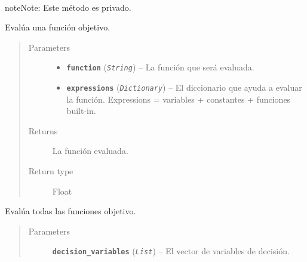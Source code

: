 \documentclass[letterpaper,10pt,english]{sphinxmanual}
\begin{document}
\begin{fulllineitems}
\begin{fulllineitems}
\label{Model/Community/Population/Individual/Individual:Model.Community.Population.Individual.Individual.Individual._Individual__evaluate_single_function}~
\begin{notice}{note}{Note:}
Este método es privado.
\end{notice}

Evalúa una función objetivo.
\begin{quote}\begin{description}
\item[{Parameters}] \leavevmode\begin{itemize}
\item {} 
\textbf{\texttt{function}} (\emph{\texttt{String}}) -- La función que será evaluada.

\item {} 
\textbf{\texttt{expressions}} (\emph{\texttt{Dictionary}}) -- El diccionario que ayuda a evaluar la función.
Expressions = variables + constantes + funciones built-in.

\end{itemize}

\item[{Returns}] \leavevmode
La función evaluada.

\item[{Return type}] \leavevmode
Float

\end{description}\end{quote}

\end{fulllineitems}


\begin{fulllineitems}
\label{Model/Community/Population/Individual/Individual:Model.Community.Population.Individual.Individual.Individual.evaluate_functions}
Evalúa todas las funciones objetivo.
\begin{quote}\begin{description}
\item[{Parameters}] \leavevmode
\textbf{\texttt{decision\_variables}} (\emph{\texttt{List}}) -- El vector de variables de decisión.

\end{description}\end{quote}


\end{fulllineitems}
\end{fulllineitems}
\end{document}
